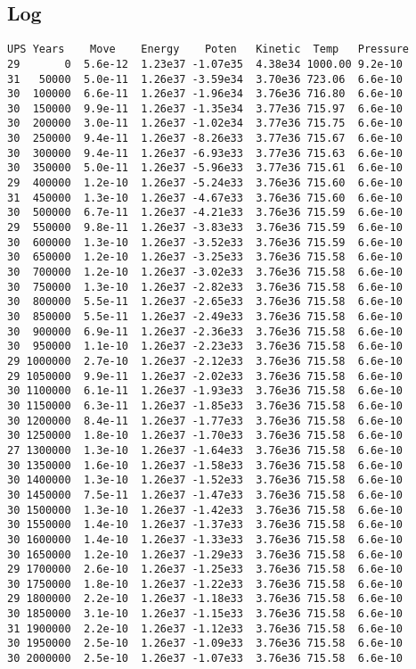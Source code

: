 \documentclass[../main.tex]{subfiles}
\begin{document}
\subsection{Log}
\singlespacing
\begin{verbatim}
UPS Years    Move    Energy    Poten   Kinetic  Temp   Pressure
29       0  5.6e-12  1.23e37 -1.07e35  4.38e34 1000.00 9.2e-10
31   50000  5.0e-11  1.26e37 -3.59e34  3.70e36 723.06  6.6e-10
30  100000  6.6e-11  1.26e37 -1.96e34  3.76e36 716.80  6.6e-10
30  150000  9.9e-11  1.26e37 -1.35e34  3.77e36 715.97  6.6e-10
30  200000  3.0e-11  1.26e37 -1.02e34  3.77e36 715.75  6.6e-10
30  250000  9.4e-11  1.26e37 -8.26e33  3.77e36 715.67  6.6e-10
30  300000  9.4e-11  1.26e37 -6.93e33  3.77e36 715.63  6.6e-10
30  350000  5.0e-11  1.26e37 -5.96e33  3.77e36 715.61  6.6e-10
29  400000  1.2e-10  1.26e37 -5.24e33  3.76e36 715.60  6.6e-10
31  450000  1.3e-10  1.26e37 -4.67e33  3.76e36 715.60  6.6e-10
30  500000  6.7e-11  1.26e37 -4.21e33  3.76e36 715.59  6.6e-10
29  550000  9.8e-11  1.26e37 -3.83e33  3.76e36 715.59  6.6e-10
30  600000  1.3e-10  1.26e37 -3.52e33  3.76e36 715.59  6.6e-10
30  650000  1.2e-10  1.26e37 -3.25e33  3.76e36 715.58  6.6e-10
30  700000  1.2e-10  1.26e37 -3.02e33  3.76e36 715.58  6.6e-10
30  750000  1.3e-10  1.26e37 -2.82e33  3.76e36 715.58  6.6e-10
30  800000  5.5e-11  1.26e37 -2.65e33  3.76e36 715.58  6.6e-10
30  850000  5.5e-11  1.26e37 -2.49e33  3.76e36 715.58  6.6e-10
30  900000  6.9e-11  1.26e37 -2.36e33  3.76e36 715.58  6.6e-10
30  950000  1.1e-10  1.26e37 -2.23e33  3.76e36 715.58  6.6e-10
29 1000000  2.7e-10  1.26e37 -2.12e33  3.76e36 715.58  6.6e-10
29 1050000  9.9e-11  1.26e37 -2.02e33  3.76e36 715.58  6.6e-10
30 1100000  6.1e-11  1.26e37 -1.93e33  3.76e36 715.58  6.6e-10
30 1150000  6.3e-11  1.26e37 -1.85e33  3.76e36 715.58  6.6e-10
30 1200000  8.4e-11  1.26e37 -1.77e33  3.76e36 715.58  6.6e-10
30 1250000  1.8e-10  1.26e37 -1.70e33  3.76e36 715.58  6.6e-10
27 1300000  1.3e-10  1.26e37 -1.64e33  3.76e36 715.58  6.6e-10
30 1350000  1.6e-10  1.26e37 -1.58e33  3.76e36 715.58  6.6e-10
30 1400000  1.3e-10  1.26e37 -1.52e33  3.76e36 715.58  6.6e-10
30 1450000  7.5e-11  1.26e37 -1.47e33  3.76e36 715.58  6.6e-10
30 1500000  1.3e-10  1.26e37 -1.42e33  3.76e36 715.58  6.6e-10
30 1550000  1.4e-10  1.26e37 -1.37e33  3.76e36 715.58  6.6e-10
30 1600000  1.4e-10  1.26e37 -1.33e33  3.76e36 715.58  6.6e-10
30 1650000  1.2e-10  1.26e37 -1.29e33  3.76e36 715.58  6.6e-10
29 1700000  2.6e-10  1.26e37 -1.25e33  3.76e36 715.58  6.6e-10
30 1750000  1.8e-10  1.26e37 -1.22e33  3.76e36 715.58  6.6e-10
29 1800000  2.2e-10  1.26e37 -1.18e33  3.76e36 715.58  6.6e-10
30 1850000  3.1e-10  1.26e37 -1.15e33  3.76e36 715.58  6.6e-10
31 1900000  2.2e-10  1.26e37 -1.12e33  3.76e36 715.58  6.6e-10
30 1950000  2.5e-10  1.26e37 -1.09e33  3.76e36 715.58  6.6e-10
30 2000000  2.5e-10  1.26e37 -1.07e33  3.76e36 715.58  6.6e-10
\end{verbatim}
\onehalfspacing
\end{document}

